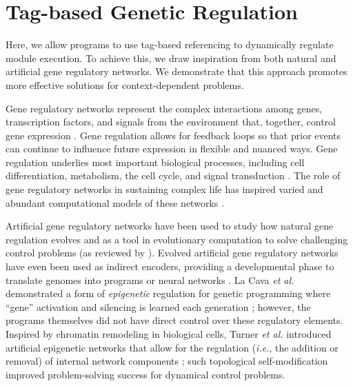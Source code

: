 
\section{Tag-based Genetic Regulation}
\label{chapter:tag-based-regulation:sec:tag-based-genetic-regulation}

Here, we allow programs to use tag-based referencing to dynamically regulate module execution.
To achieve this, we draw inspiration from both natural and artificial gene regulatory networks. 
We demonstrate that this approach promotes more effective solutions for context-dependent problems.

Gene regulatory networks represent the complex interactions among genes, transcription factors, and signals from the environment that, together, control gene expression \citep{banzhaf_artificial_2015}.
Gene regulation allows for feedback loops so that prior events can continue to influence future expression in flexible and nuanced ways. 
Gene regulation underlies most important biological processes, including cell differentiation, metabolism, the cell cycle, and signal transduction \citep{karlebach_modelling_2008}.
The role of gene regulatory networks in sustaining complex life has inspired varied and abundant computational models of these networks \citep{karlebach_modelling_2008,cussat-blanc_artificial_2019}.

Artificial gene regulatory networks have been used to study how natural gene regulation evolves \citep{aldana_robustness_2007,crombach_evolution_2008,draghi_evolutionary_2009} and as a tool in evolutionary computation to solve challenging control problems (as reviewed by \citep{cussat-blanc_artificial_2019}).
Evolved artificial gene regulatory networks have even been used as indirect encoders, providing a developmental phase to translate genomes into programs \citep{banzhaf_artificial_2003,lopes_regulatory_2012} or neural networks \citep{kowaliw_using_2014}.
La Cava \textit{et al.} demonstrated a form of \textit{epigenetic} regulation for genetic programming where ``gene'' activation and silencing is learned each generation \citep{la_cava_genetic_2015,la_cava_inheritable_2015}; however, the programs themselves did not have direct control over these regulatory elements.
Inspired by chromatin remodeling in biological cells, Turner \textit{et al.} introduced artificial epigenetic networks that allow for the regulation (\textit{i.e.}, the addition or removal) of internal network components  \citep{turner_artificial_2017}; such topological self-modification improved problem-solving success for dynamical control problems.

